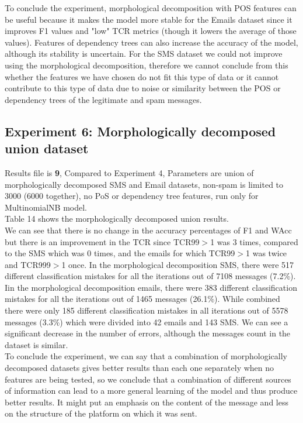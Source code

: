 \documentclass[11pt,a4paper]{article}
\begin{document}
To conclude the experiment, morphological decomposition with POS features can be useful because it makes the model more stable for the Emails dataset since it improves F1 values and "low" TCR metrics (though it lowers the average of those values). Features of dependency trees can also increase the accuracy of the model, although its stability is uncertain. 
For the SMS dataset we could not improve using the morphological decomposition, therefore we cannot conclude from this whether the features we have chosen do not fit this type of data or it cannot contribute to this type of data due to noise or similarity between the POS or dependency trees of the legitimate and spam messages.

\subsection{Experiment 6: Morphologically decomposed union dataset}
\label{ssec:Experiment 6}
Results file is \textbf{9}, Compared to Experiment 4, Parameters are union of morphologically decomposed SMS and Email datasets, non-spam is limited to 3000 (6000 together), no PoS or dependency tree features, run only for MultinomialNB model.\\
Table 14 shows the morphologically decomposed union results.\\
We can see that there is no change in the accuracy percentages of F1 and WAcc but there is an improvement in the TCR since TCR99${>}$1 was 3 times, compared to the SMS which was 0 times, and the emails for which TCR99${>}$1 was twice and TCR999${>}$1 once.
In the morphological decomposition SMS, there were 517 different classification mistakes for all the iterations out of 7108 messages (7.2\%). Iin the morphological decomposition emails, there were 383 different classification mistakes for all the iterations out of 1465 messages (26.1\%). While combined there were only 185 different classification mistakes in all iterations out of 5578 messages (3.3\%) which were divided into 42 emails and 143 SMS.
We can see a significant decrease in the number of errors, although the messages count in the dataset is similar.\\
To conclude the experiment, we can say that a combination of morphologically decomposed datasets gives better results than each one separately when no features are being tested, so we conclude that a combination of different sources of information can lead to a more general learning of the model and thus produce better results. It might put an emphasis on the content of the message and less on the structure of the platform on which it was sent.
\end{document}
